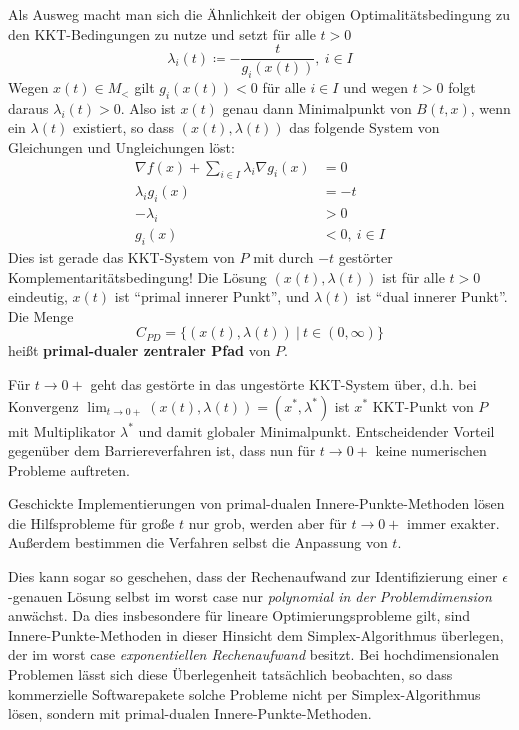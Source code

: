 \documentclass[12pt]{extreport} %
\theoremstyle{named}
\theoremstyle{nnamed}
\theoremstyle{itshape}
\theoremstyle{normal}
\begin{document}
Als Ausweg macht man sich die Ähnlichkeit der obigen Optimalitätsbedingung zu den KKT-Bedingungen zu nutze und setzt für alle $t > 0$
$$ \lambda_i(t) \coloneqq - \frac{t}{g_i(x(t))}, ~ i \in I $$
Wegen $x(t) \in M_<$ gilt $g_i(x(t)) < 0$ für alle $i \in I$ und wegen $t > 0$ folgt daraus $\lambda_i(t) > 0$. Also ist $x(t)$ genau dann Minimalpunkt von $B(t, x)$, wenn ein $\lambda(t)$ existiert, so dass $(x(t), \lambda(t))$ das folgende System von Gleichungen und Ungleichungen löst:
	\begin{align*}
		\nabla f(x) + \sum_{i \in I} \lambda_i \nabla g_i(x) & = 0 \\
		\lambda_i g_i(x) & = -t \\
		-\lambda_i & > 0 \\
		g_i(x) & < 0, ~ i \in I
	\end{align*}
Dies ist gerade das KKT-System von $P$ mit durch $-t$ gestörter Komplementaritätsbedingung! Die Lösung $(x(t), \lambda(t))$ ist für alle $t > 0$ eindeutig, $x(t)$ ist \enquote{primal innerer Punkt}, und $\lambda(t)$ ist \enquote{dual innerer Punkt}. Die Menge
$$ C_{PD} = \big\{ (x(t), \lambda(t)) ~|~t \in (0, \infty) \big\} $$
heißt \textbf{primal-dualer zentraler Pfad} von $P$. ~\bigskip

Für $t \rightarrow 0+$ geht das gestörte in das ungestörte KKT-System über, d.h. bei Konvergenz $\lim_{t\rightarrow 0+} \left( x(t), \lambda(t) \right) = \left( x^*, \lambda^* \right)$ ist $x^*$ KKT-Punkt von $P$ mit Multiplikator $\lambda^*$ und damit globaler Minimalpunkt. Entscheidender Vorteil gegenüber dem Barriereverfahren ist, dass nun für $t \rightarrow 0+$ keine numerischen Probleme auftreten. ~\bigskip

Geschickte Implementierungen von primal-dualen Innere-Punkte-Methoden lösen die Hilfsprobleme für große $t$ nur grob, werden aber für $t \rightarrow 0+$ immer exakter. Außerdem bestimmen die Verfahren selbst die Anpassung von $t$. ~\bigskip

Dies kann sogar so geschehen, dass der Rechenaufwand zur Identifizierung einer $\epsilon$-genauen Lösung selbst im worst case nur \textit{polynomial in der Problemdimension} anwächst. Da dies insbesondere für lineare Optimierungsprobleme gilt, sind Innere-Punkte-Methoden in dieser Hinsicht dem Simplex-Algorithmus überlegen, der im worst case \textit{exponentiellen Rechenaufwand} besitzt. Bei hochdimensionalen Problemen lässt sich diese Überlegenheit tatsächlich beobachten, so dass kommerzielle Softwarepakete solche Probleme nicht per Simplex-Algorithmus lösen, sondern mit primal-dualen Innere-Punkte-Methoden. ~\bigskip
\end{document}
